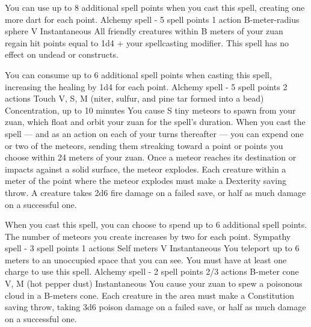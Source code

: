     You can use up to 8 additional spell points when you cast this spell, creating one more dart for each point.
    {Alchemy spell - 5 spell points}
    {1 action}
    {B-meter-radius sphere}
    {V}
    {Instantaneous}
    All friendly creatures within B meters of your zuan regain hit points equal to 1d4 + your spellcasting modifier.
    This spell has no effect on undead or constructs.

    You can consume up to 6 additional spell points when casting this spell, increasing the healing by 1d4 for each point.
    {Alchemy spell - 5 spell points}
    {2 actions}
    {Touch}
    {V, S, M (niter, sulfur, and pine tar formed into a bead)}
    {Concentration, up to 10 minutes}
    You cause S tiny meteors to spawn from your zuan, which float and orbit your zuan for the spell's duration.
    When you cast the spell --- and as an action on each of your turns thereafter --- you can expend one or two of the meteors, sending them streaking toward a point or points you choose within 24 meters of your zuan.
    Once a meteor reaches its destination or impacts against a solid surface, the meteor explodes.
    Each creature within a meter of the point where the meteor explodes must make a Dexterity saving throw.
    A creature takes 2d6 fire damage on a failed save, or half as much damage on a successful one.

    When you cast this spell, you can choose to spend up to 6 additional spell points.
    The number of meteors you create increases by two for each point.
    {Sympathy spell - 3 spell points}
    {1 actions}
    {Self meters}
    {V}
    {Instantaneous}
    You teleport up to 6 meters to an unoccupied space that you can see.
    You must have at least one charge to use this spell.
    {Alchemy spell - 2 spell points}
    {2/3 actions}
    {B-meter cone}
    {V, M (hot pepper dust)}
    {Instantaneous}
    You cause your zuan to spew a poisonous cloud in a B-meters cone.
    Each creature in the area must make a Constitution saving throw, taking 3d6 poison damage on a failed save, or half as much damage on a successful one.

